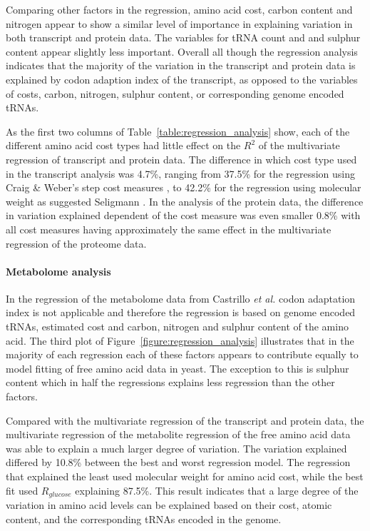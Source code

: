 Comparing other factors in the regression, amino acid cost, carbon content and nitrogen appear to show a similar level of importance in explaining variation in both transcript and protein data. The variables for tRNA count and and sulphur content appear slightly less important. Overall all though the regression analysis indicates that the majority of the variation in the transcript and protein data is explained by codon adaption index of the transcript, as opposed to the variables of costs, carbon, nitrogen, sulphur content, or corresponding genome encoded tRNAs.

As the first two columns of Table~\vref{table:regression_analysis} show, each of the different amino acid cost types had little effect on the $R^2$ of the multivariate regression of transcript and protein data. The difference in which cost type used in the transcript analysis was 4.7\%, ranging from 37.5\% for the regression using Craig \& Weber's step cost measures \cite{craig1998}, to 42.2\% for the regression using molecular weight as suggested Seligmann \cite{seligmann2003}. In the analysis of the protein data, the difference in variation explained dependent of the cost measure was even smaller 0.8\% with all cost measures having approximately the same effect in the multivariate regression of the proteome data.

\paragraph{Metabolome analysis}

In the regression of the metabolome data from Castrillo \emph{et al.} \cite{castrillo2007} codon adaptation index is not applicable and therefore the regression is based on genome encoded tRNAs, estimated cost and carbon, nitrogen and sulphur content of the amino acid. The third plot of Figure~\ref{figure:regression_analysis} illustrates that in the majority of each regression each of these factors appears to contribute equally to model fitting of free amino acid data in yeast. The exception to this is sulphur content which in half the regressions explains less regression than the other factors.

Compared with the multivariate regression of the transcript and protein data, the multivariate regression of the metabolite regression of the free amino acid data was able to explain a much larger degree of variation. The variation explained differed by 10.8\% between the best and worst regression model. The regression that explained the least used molecular weight for amino acid cost, while the best fit used $R_{glucose}$ explaining 87.5\%. This result indicates that a large degree of the variation in amino acid levels can be explained based on their cost, atomic content, and the corresponding tRNAs encoded in the genome.

